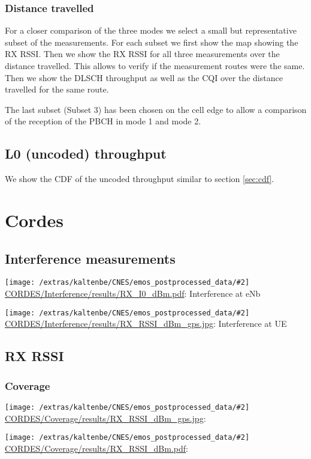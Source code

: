 \documentclass[a4paper,10pt]{article}
\newcommand{\printfile}[2][]{
 \begin{minipage}{8cm}
  \centering
  \texttt{[image: /extras/kaltenbe/CNES/emos\_postprocessed\_data/\#2]}
  \url{#2}: #1

 \end{minipage}
}
\begin{document}
\subsubsection{Distance travelled}
\label{sec:dist_travelled}

For a closer comparison of the three modes we select a small but representative subset of the measurements. For each subset we first show the map showing the RX RSSI. Then we show the RX RSSI for all three measurements over the distance travelled. This allows to verify if the measurement routes were the same. Then we show the DLSCH throughput as well as the CQI over the distance travelled for the same route. 

The last subset (Subset 3) has been chosen on the cell edge to allow a comparison of the reception of the PBCH in mode 1 and mode 2.



\subsection{L0 (uncoded) throughput}

We show the CDF of the uncoded throughput similar to section \ref{sec:cdf}.


\section{Cordes}
\label{sec:cordes}

\subsection{Interference measurements}

\printfile[Interference at eNb]{CORDES/Interference/results/RX_I0_dBm.pdf}
\printfile[Interference at UE]{CORDES/Interference/results/RX_RSSI_dBm_gps.jpg}


\subsection{RX RSSI}


\subsubsection{Coverage}
\printfile{CORDES/Coverage/results/RX_RSSI_dBm_gps.jpg}
\printfile{CORDES/Coverage/results/RX_RSSI_dBm.pdf}
 
\end{document}
